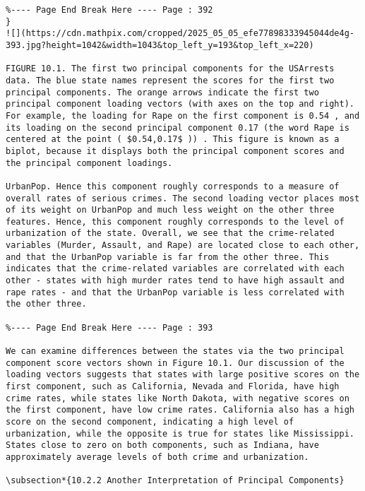 \documentclass[10pt]{article}
\begin{document}
\begin{verbatim}
%---- Page End Break Here ---- Page : 392
}
![](https://cdn.mathpix.com/cropped/2025_05_05_efe77898333945044de4g-393.jpg?height=1042&width=1043&top_left_y=193&top_left_x=220)

FIGURE 10.1. The first two principal components for the USArrests data. The blue state names represent the scores for the first two principal components. The orange arrows indicate the first two principal component loading vectors (with axes on the top and right). For example, the loading for Rape on the first component is 0.54 , and its loading on the second principal component 0.17 (the word Rape is centered at the point ( $0.54,0.17$ )) . This figure is known as a biplot, because it displays both the principal component scores and the principal component loadings.

UrbanPop. Hence this component roughly corresponds to a measure of overall rates of serious crimes. The second loading vector places most of its weight on UrbanPop and much less weight on the other three features. Hence, this component roughly corresponds to the level of urbanization of the state. Overall, we see that the crime-related variables (Murder, Assault, and Rape) are located close to each other, and that the UrbanPop variable is far from the other three. This indicates that the crime-related variables are correlated with each other - states with high murder rates tend to have high assault and rape rates - and that the UrbanPop variable is less correlated with the other three.

%---- Page End Break Here ---- Page : 393

We can examine differences between the states via the two principal component score vectors shown in Figure 10.1. Our discussion of the loading vectors suggests that states with large positive scores on the first component, such as California, Nevada and Florida, have high crime rates, while states like North Dakota, with negative scores on the first component, have low crime rates. California also has a high score on the second component, indicating a high level of urbanization, while the opposite is true for states like Mississippi. States close to zero on both components, such as Indiana, have approximately average levels of both crime and urbanization.

\subsection*{10.2.2 Another Interpretation of Principal Components}


\end{verbatim}
\end{document}
